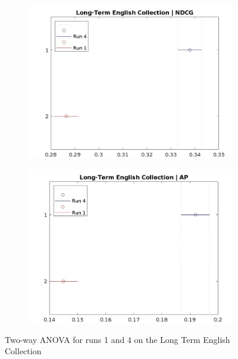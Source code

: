 \begin{figure}[!h]
    \centering
    \begin{subfigure}[b]{0.49\textwidth}
        \centering
        \includegraphics[width=\textwidth]{figure/StatisticalAnalysis/ANOVA 2/ndcg-lt-en.jpeg}
        \label{fig:lt_anova_eng_ndcg}
    \end{subfigure}
    \hfill
    \begin{subfigure}[b]{0.49\textwidth}
        \centering
        \includegraphics[width=\textwidth]{figure/StatisticalAnalysis/ANOVA 2/ap-lt-en.jpeg}
        \label{fig:lt_anova_eng_ap}
    \end{subfigure}
    \caption{Two-way ANOVA for runs 1 and 4 on the Long Term English Collection}
    \label{fig:lt_anova_eng}
\end{figure}

